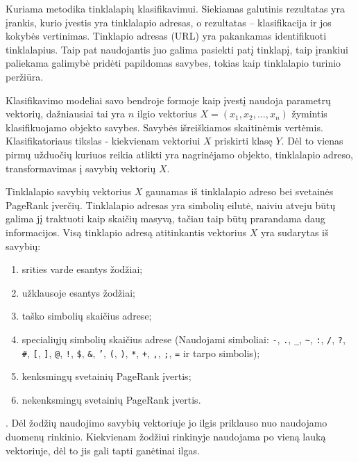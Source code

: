 Kuriama metodika tinklalapių klasifikavimui. Siekiamas galutinis rezultatas yra įrankis, kurio įvestis yra tinklalapio adresas, o rezultatas -- klasifikacija ir jos kokybės vertinimas. Tinklapio adresas (URL) yra pakankamas identifikuoti tinklalapius. Taip pat naudojantis juo galima pasiekti patį tinklapį, taip įrankiui paliekama galimybė pridėti papildomas savybes, tokias kaip tinklalapio turinio peržiūra.

Klasifikavimo modeliai savo bendroje formoje kaip įvestį naudoja parametrų vektorių, dažniausiai tai yra $n$ ilgio vektorius $X = (x_1, x_2, ... , x_n)$ žymintis klasifikuojamo objekto savybes. Savybės išreiškiamos skaitinėmis vertėmis. Klasifikatoriaus tikslas - kiekvienam vektoriui $X$ priskirti klasę $Y$. Dėl to vienas pirmų užduočių kuriuos reikia atlikti yra nagrinėjamo objekto, tinklalapio adreso, transformavimas į savybių vektorių $X$.


Tinklalapio savybių vektorius $X$ gaunamas iš tinklalapio adreso bei svetainės PageRank įverčių. Tinklalapio adresas yra simbolių eilutė, naiviu atveju būtų galima jį traktuoti kaip skaičių masyvą, tačiau taip būtų prarandama daug informacijos. Visą tinklapio adresą atitinkantis vektorius $X$ yra sudarytas iš savybių:
\begin{enumerate}
\item srities varde esantys žodžiai;
\item užklausoje esantys žodžiai;
\item taško simbolių skaičius adrese;
\item specialiųjų simbolių skaičius adrese (Naudojami simboliai:
\texttt{-},
\texttt{.},
\texttt{\_},
\texttt{\~},
\texttt{:},
\texttt{/},
\texttt{?},
\texttt{\#},
\texttt{[},
\texttt{]},
\texttt{@},
\texttt{!},
\texttt{\$},
\texttt{\&},
\texttt{'},
\texttt{(},
\texttt{)},
\texttt{*},
\texttt{+},
\texttt{,},
\texttt{;},
\texttt{=}
ir tarpo simbolis);
\item kenksmingų svetainių PageRank įvertis;
\item nekenksmingų svetainių PageRank įvertis.
\end{enumerate}.
Dėl žodžių naudojimo savybių vektoriuje jo ilgis priklauso nuo naudojamo duomenų rinkinio. Kiekvienam žodžiui rinkinyje naudojama po vieną lauką vektoriuje, dėl to jis gali tapti ganėtinai ilgas.


